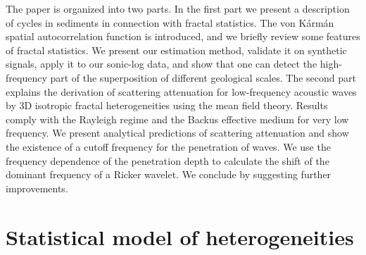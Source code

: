 The paper is organized into two parts.
In the first part we present a description of cycles in sediments
in connection with fractal statistics.
The von K\'arm\'an spatial autocorrelation function is introduced,
and we briefly review some features of fractal statistics.
We present our estimation method, validate it on synthetic signals,
apply it to our sonic-log data, and show that one can detect the high-frequency part
of the superposition of different geological scales.
The second part explains the derivation of scattering attenuation
for low-frequency acoustic waves by 3D isotropic fractal heterogeneities using the mean field theory.
Results comply with the Rayleigh regime
and the Backus effective medium for very low frequency.
We present analytical predictions of scattering attenuation and show the existence of
a cutoff frequency for the penetration of waves.
We use the frequency dependence of the penetration depth
to calculate the shift of the dominant frequency of a Ricker wavelet.
We conclude by suggesting further improvements.


\section{Statistical model of heterogeneities}


